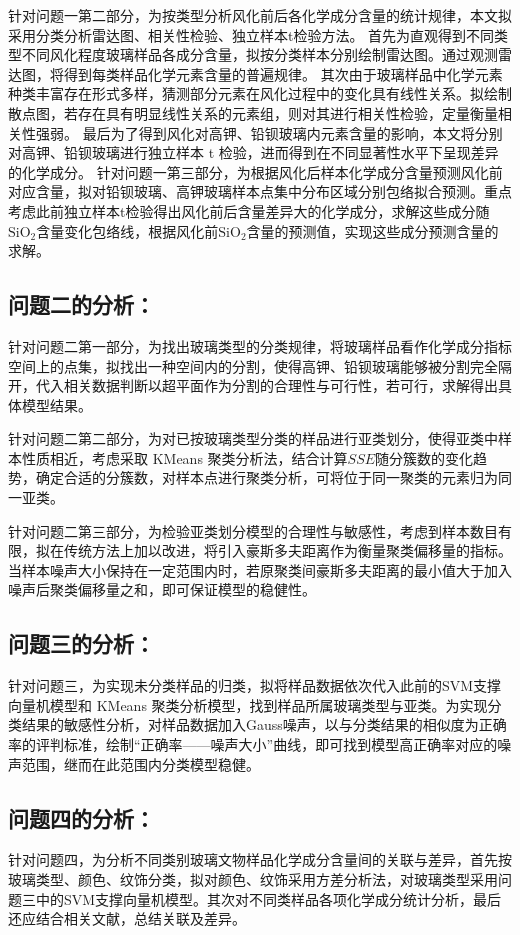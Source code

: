 \documentclass[withoutpreface,bwprint]{cumcmthesis}
\newcommand{\mr}[1]{\mathrm{#1}}
\begin{document}
针对问题一第二部分，为按类型分析风化前后各化学成分含量的统计规律，本文拟采用分类分析雷达图、相关性检验、独立样本t检验方法。
首先为直观得到不同类型不同风化程度玻璃样品各成分含量，拟按分类样本分别绘制雷达图。通过观测雷达图，将得到每类样品化学元素含量的普遍规律。
其次由于玻璃样品中化学元素种类丰富存在形式多样，猜测部分元素在风化过程中的变化具有线性关系。拟绘制散点图，若存在具有明显线性关系的元素组，则对其进行相关性检验，定量衡量相关性强弱。
最后为了得到风化对高钾、铅钡玻璃内元素含量的影响，本文将分别对高钾、铅钡玻璃进行独立样本 t 检验，进而得到在不同显著性水平下呈现差异的化学成分。
针对问题一第三部分，为根据风化后样本化学成分含量预测风化前对应含量，拟对铅钡玻璃、高钾玻璃样本点集中分布区域分别包络拟合预测。重点考虑此前独立样本t检验得出风化前后含量差异大的化学成分，求解这些成分随$\mr{SiO_2}$含量变化包络线，根据风化前$\mr{SiO_2}$含量的预测值，实现这些成分预测含量的求解。
\subsection{问题二的分析：}
针对问题二第一部分，为找出玻璃类型的分类规律，将玻璃样品看作化学成分指标空间上的点集，拟找出一种空间内的分割，使得高钾、铅钡玻璃能够被分割完全隔开，代入相关数据判断以超平面作为分割的合理性与可行性，若可行，求解得出具体模型结果。

针对问题二第二部分，为对已按玻璃类型分类的样品进行亚类划分，使得亚类中样本性质相近，考虑采取 KMeans 聚类分析法，结合计算$SSE$随分簇数的变化趋势，确定合适的分簇数，对样本点进行聚类分析，可将位于同一聚类的元素归为同一亚类。

针对问题二第三部分，为检验亚类划分模型的合理性与敏感性，考虑到样本数目有限，拟在传统方法上加以改进，将引入豪斯多夫距离作为衡量聚类偏移量的指标。当样本噪声大小保持在一定范围内时，若原聚类间豪斯多夫距离的最小值大于加入噪声后聚类偏移量之和，即可保证模型的稳健性。
\subsection{问题三的分析：}
针对问题三，为实现未分类样品的归类，拟将样品数据依次代入此前的SVM支撑向量机模型和 KMeans 聚类分析模型，找到样品所属玻璃类型与亚类。为实现分类结果的敏感性分析，对样品数据加入Gauss噪声，以与分类结果的相似度为正确率的评判标准，绘制“正确率——噪声大小”曲线，即可找到模型高正确率对应的噪声范围，继而在此范围内分类模型稳健。
\subsection{问题四的分析：}
针对问题四，为分析不同类别玻璃文物样品化学成分含量间的关联与差异，首先按玻璃类型、颜色、纹饰分类，拟对颜色、纹饰采用方差分析法，对玻璃类型采用问题三中的SVM支撑向量机模型。其次对不同类样品各项化学成分统计分析，最后还应结合相关文献，总结关联及差异。
\end{document}
